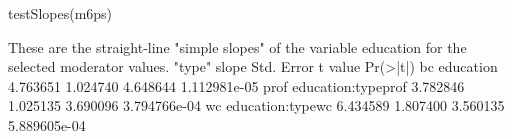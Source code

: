 \begin{Schunk}
\begin{Sinput}
 testSlopes(m6ps)
\end{Sinput}
\begin{Soutput}
These are the straight-line "simple slopes" of the variable education  
 for the selected moderator values. 
                 "type"    slope Std. Error  t value     Pr(>|t|)
bc            education 4.763651   1.024740 4.648644 1.112981e-05
prof education:typeprof 3.782846   1.025135 3.690096 3.794766e-04
wc     education:typewc 6.434589   1.807400 3.560135 5.889605e-04
\end{Soutput}
\end{Schunk}
